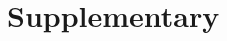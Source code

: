 \documentclass[11pt,a4paper]{article}
\begin{document}






\newpage





\newpage
\section*{Supplementary}
\end{document}
